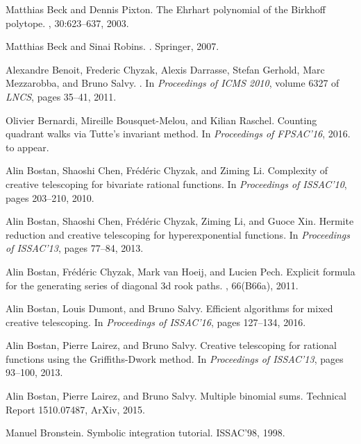 \documentclass{jssc}
\begin{document}
\begin{thebibliography}{199}
Matthias Beck and Dennis Pixton.
\newblock The {E}hrhart polynomial of the {B}irkhoff polytope.
, 30:623--637, 2003.

Matthias Beck and Sinai Robins.
.
\newblock Springer, 2007.

Alexandre Benoit, Frederic Chyzak, Alexis Darrasse, Stefan Gerhold, Marc
  Mezzarobba, and Bruno Salvy.
.
\newblock In {\em Proceedings of ICMS 2010}, volume 6327 of {\em LNCS}, pages
  35--41, 2011.

Olivier Bernardi, Mireille Bousquet-Melou, and Kilian Raschel.
\newblock Counting quadrant walks via {T}utte's invariant method.
\newblock In {\em Proceedings of FPSAC'16}, 2016.
\newblock to appear.

Alin Bostan, Shaoshi Chen, Fr{\'e}d{\'e}ric Chyzak, and Ziming Li.
\newblock Complexity of creative telescoping for bivariate rational functions.
\newblock In {\em Proceedings of ISSAC'10}, pages 203--210, 2010.

Alin Bostan, Shaoshi Chen, Fr{\'e}d{\'e}ric Chyzak, Ziming Li, and Guoce Xin.
\newblock Hermite reduction and creative telescoping for hyperexponential
  functions.
\newblock In {\em Proceedings of ISSAC'13}, pages 77--84, 2013.

Alin Bostan, Fr{\'e}d{\'e}ric Chyzak, Mark van Hoeij, and Lucien Pech.
\newblock Explicit formula for the generating series of diagonal 3d rook paths.
, 66(B66a), 2011.

Alin Bostan, Louis Dumont, and Bruno Salvy.
\newblock Efficient algorithms for mixed creative telescoping.
\newblock In {\em Proceedings of ISSAC'16}, pages 127--134, 2016.

Alin Bostan, Pierre Lairez, and Bruno Salvy.
\newblock Creative telescoping for rational functions using the
  {G}riffiths-{D}work method.
\newblock In {\em Proceedings of ISSAC'13}, pages 93--100, 2013.

Alin Bostan, Pierre Lairez, and Bruno Salvy.
\newblock Multiple binomial sums.
\newblock Technical Report 1510.07487, ArXiv, 2015.

Manuel Bronstein.
\newblock Symbolic integration tutorial.
\newblock ISSAC'98, 1998.


\end{thebibliography}
\end{document}
